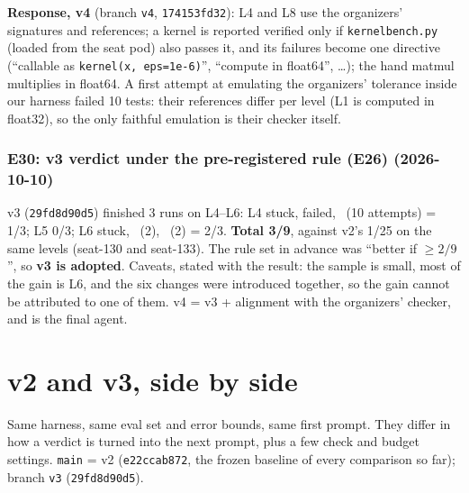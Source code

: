 \documentclass[11pt]{article}
\newcommand{\code}[1]{\texttt{#1}}
\newcommand{\entry}[2]{\subsubsection*{#1 \textnormal{\small(#2)}}}
\begin{document}
\textbf{Response, v4} (branch \code{v4}, \code{174153fd32}): L4 and L8 use the organizers' signatures and
references; a kernel is reported verified only if \code{kernelbench.py} (loaded from the seat pod) also
passes it, and its failures become one directive (``callable as \code{kernel(x, eps=1e-6)}'', ``compute in
float64'', \dots); the hand matmul multiplies in float64. A first attempt at emulating the organizers'
tolerance inside our harness failed 10 tests: their references differ per level (L1 is computed in
float32), so the only faithful emulation is their checker itself.

\entry{E30: v3 verdict under the pre-registered rule (E26)}{2026-10-10}
v3 (\code{29fd8d90d5}) finished 3 runs on L4--L6: L4 stuck, failed, \checkmark\ (10 attempts) = 1/3; L5 0/3;
L6 stuck, \checkmark\ (2), \checkmark\ (2) = 2/3. \textbf{Total 3/9}, against v2's 1/25 on the same levels
(seat-130 and seat-133). The rule set in advance was ``better if $\ge 2/9$'', so \textbf{v3 is adopted}.
Caveats, stated with the result: the sample is small, most of the gain is L6, and the six changes were
introduced together, so the gain cannot be attributed to one of them. v4 = v3 + alignment with the
organizers' checker, and is the final agent.

\section{v2 and v3, side by side}
\label{sec:v2v3}

Same harness, same eval set and error bounds, same first prompt. They differ in how a verdict is turned
into the next prompt, plus a few check and budget settings. \code{main} = v2 (\code{e22ccab872}, the frozen
baseline of every comparison so far); branch \code{v3} (\code{29fd8d90d5}).
\end{document}
